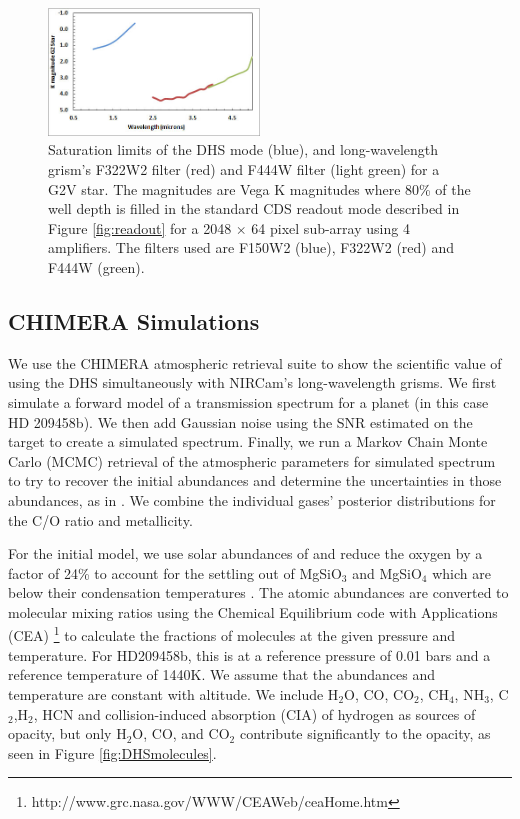 \documentclass[iop]{emulateapj}
\begin{document}
\begin{figure}[!ht]
\includegraphics[width=0.5\textwidth]{sat_limits.jpg}
\caption{Saturation limits of the DHS mode (blue), and long-wavelength grism's F322W2 filter (red) and F444W filter (light green) for a G2V star.
The magnitudes are Vega K magnitudes where 80\% of the well depth is filled in the standard CDS readout mode described in Figure \ref{fig:readout}  for a 2048 $\times$ 64 pixel sub-array using 4 amplifiers.
The filters used are F150W2 (blue), F322W2 (red) and F444W (green).}\label{fig:DHSaps}
\end{figure}

\subsection{CHIMERA Simulations}\label{sec:simulations}

We use the CHIMERA atmospheric retrieval suite \citep{line2013chimera,line2014CtOsecE} to show the scientific value of using the DHS simultaneously with NIRCam's long-wavelength grisms.
We first simulate a forward model of a transmission spectrum for a planet (in this case HD 209458b).
We then add Gaussian noise using the SNR estimated on the target to create a simulated spectrum.
Finally, we run a Markov Chain Monte Carlo (MCMC) retrieval of the atmospheric parameters for simulated spectrum to try to recover the initial abundances and determine the uncertainties in those abundances, as in \citet{greene2016jwst_trans}.
We combine the individual gases' posterior distributions for the C/O ratio and metallicity.

For the initial model, we use solar abundances of \citet{asplund} and reduce the oxygen by a factor of 24\% to account for the settling out of MgSiO$_3$ and MgSiO$_4$ which are below their condensation temperatures \citep{sing2016continuum}.
The atomic abundances are converted to molecular mixing ratios using the Chemical Equilibrium code with Applications (CEA) \footnote{http://www.grc.nasa.gov/WWW/CEAWeb/ceaHome.htm}\citep{gordon1996cea} to calculate the fractions of molecules at the given pressure and temperature.
For HD209458b, this is at a reference pressure of 0.01 bars and a reference temperature of 1440K.
We assume that the abundances and temperature are constant with altitude.
We include H$_2$O, CO, CO$_2$, CH$_4$, NH$_3$, C$_2$,H$_2$, HCN and collision-induced absorption (CIA) of hydrogen as sources of opacity, but only H$_2$O, CO, and CO$_2$ contribute significantly to the opacity, as seen in Figure \ref{fig:DHSmolecules}.
\end{document}
